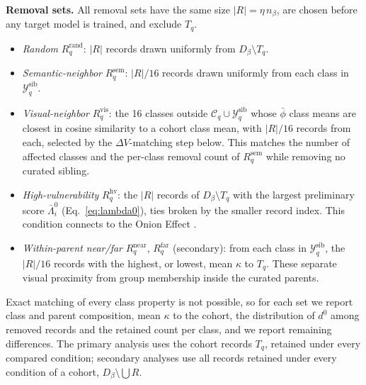 \documentclass{article} %
\begin{document}
\textbf{Removal sets.} All removal sets have the same size $|R|=\eta\,n_\beta$, are chosen before any target model is trained, and exclude $T_q$.
\begin{itemize}\setlength{\itemsep}{1pt}\setlength{\parskip}{0pt}
  \item \emph{Random} $R^{\mathrm{rand}}_q$: $|R|$ records drawn uniformly from $D_\beta\setminus T_q$.
  \item \emph{Semantic-neighbor} $R^{\mathrm{sem}}_q$: $|R|/16$ records drawn uniformly from each class in $\mathcal{Y}_q^{\mathrm{sib}}$.
  \item \emph{Visual-neighbor} $R^{\mathrm{vis}}_q$: the 16 classes outside $\mathcal{C}_q\cup\mathcal{Y}_q^{\mathrm{sib}}$ whose $\bar\phi$ class means are closest in cosine similarity to a cohort class mean, with $|R|/16$ records from each, selected by the $\Delta V$-matching step below. This matches the number of affected classes and the per-class removal count of $R^{\mathrm{sem}}_q$ while removing no curated sibling.
  \item \emph{High-vulnerability} $R^{\mathrm{hv}}_q$: the $|R|$ records of $D_\beta\setminus T_q$ with the largest preliminary score $\bar\Lambda_i^0$ (Eq.~\ref{eq:lambda0}), ties broken by the smaller record index. This condition connects to the Onion Effect \citep{carlini2022onion}.
  \item \emph{Within-parent near/far} $R^{\mathrm{near}}_q$, $R^{\mathrm{far}}_q$ (secondary): from each class in $\mathcal{Y}_q^{\mathrm{sib}}$, the $|R|/16$ records with the highest, or lowest, mean $\kappa$ to $T_q$. These separate visual proximity from group membership inside the curated parents.
\end{itemize}
Exact matching of every class property is not possible, so for each set we report class and parent composition, mean $\kappa$ to the cohort, the distribution of $d^0$ among removed records and the retained count per class, and we report remaining differences. The primary analysis uses the cohort records $T_q$, retained under every compared condition; secondary analyses use all records retained under every condition of a cohort, $D_\beta\setminus\bigcup R$.
\end{document}
